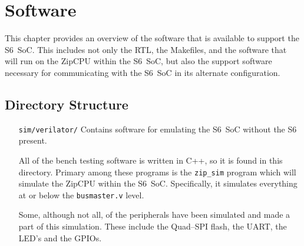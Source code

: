 \documentclass{gqtekspec}
\begin{document}
\chapter{Software}
This chapter provides an overview of the software that is available to support
the S6~SoC.  This includes not only the RTL, the Makefiles, and the software
that will run on the ZipCPU within the S6~SoC, but also the support software
necessary for communicating with the S6~SoC in its alternate configuration.

\section{Directory Structure}
\begin{itemize}
\item[{\tt sim/verilator/}] Contains software for emulating the S6~SoC
	without the S6 present.

	All of the bench testing software is written in C++, so it is found in
	this directory.  Primary among these programs is the {\tt zip\_sim}
	program which will simulate the ZipCPU within the S6~SoC.  Specifically,
	it simulates everything at or below the {\tt busmaster.v} level.

	Some, although not all, of the peripherals have been simulated and
	made a part of this simulation.  These include the Quad--SPI flash,
	the UART, the LED's and the GPIOs.


\end{itemize}
\end{document}
